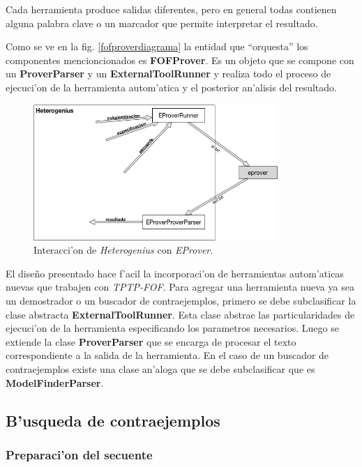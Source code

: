 Cada herramienta produce salidas diferentes, pero en general todas contienen alguna palabra clave o un marcador que permite interpretar el resultado.

Como se ve en la fig. \ref{fofproverdiagrama} la entidad que ``orquesta'' los componentes mencioncionados es \textbf{FOFProver}. Es un objeto que se compone con un \textbf{ProverParser} y un \textbf{ExternalToolRunner} y realiza todo el proceso de ejecuci'on de la herramienta autom'atica y el posterior an'alisis del resultado.


\begin{figure}[]
	\includegraphics[width=350px]{img/ejecucion_herramienta_automatica.png}
	\centering
	\caption{Interacci'on de \textit{Heterogenius} con \textit{EProver}.}
	\label{ejecucionherramientaautomatica}
\end{figure}

El diseño presentado hace f'acil la incorporaci'on de herramientas autom'aticas nuevas que trabajen con \textit{TPTP-FOF}. Para agregar una herramienta nueva ya sea un demostrador o un buscador de contraejemplos, primero se debe subclasificar la clase abstracta \textbf{ExternalToolRunner}. Esta clase abstrae las particularidades de ejecuci'on de la herramienta especificando los parametros necesarios. Luego se extiende la clase \textbf{ProverParser} que se encarga de procesar el texto correspondiente a la salida de la herramienta. En el caso de un buscador de contraejemplos existe una clase an'aloga que se debe subclasificar que es \textbf{ModelFinderParser}.



\subsection{B'usqueda de contraejemplos}

\subsubsection{Preparaci'on del secuente}

